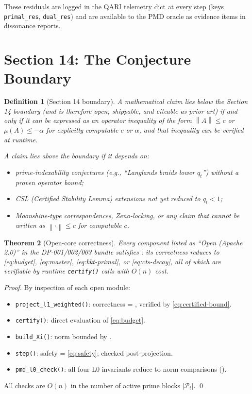 \documentclass[12pt,letterpaper]{article}
\newtheorem{theorem}{Theorem}[section]
\newtheorem{definition}[theorem]{Definition}
\newcommand{\Hnorm}[1]{\left\|#1\right\|}
\newcommand{\qt}{q_t}
\newcommand{\Pt}{\mathcal{P}_t}
\begin{document}
These residuals are logged in the QARI telemetry dict at every step
(keys \texttt{primal\_res}, \texttt{dual\_res}) and are available to
the PMD oracle as evidence items in dissonance reports.

\section{Section 14: The Conjecture Boundary}
\label{sec:s14}

\begin{definition}[Section 14 boundary]
\label{def:s14}
A mathematical claim lies \emph{below the Section 14 boundary} (and is
therefore open, shippable, and citeable as prior art) if and only if
it can be expressed as an operator inequality of the form
$\Hnorm{A} \leq c$ or $\mu(A) \leq -\alpha$ for explicitly computable
$c$ or $\alpha$, and that inequality can be verified at runtime.

A claim lies \emph{above the boundary} if it depends on:
\begin{itemize}
  \item prime-indexability conjectures (e.g., ``Langlands braids
        lower $\qt$'') without a proven operator bound;
  \item CSL (Certified Stability Lemma) extensions not yet reduced
        to $\qt < 1$;
  \item Moonshine-type correspondences, Zeno-locking, or any claim
        that cannot be written as $\Hnorm{\cdot} \leq c$ for
        computable $c$.
\end{itemize}
\end{definition}

\begin{theorem}[Open-core correctness]
\label{thm:opencore}
Every component listed as ``Open (Apache 2.0)'' in the DP-001/002/003
bundle satisfies : its correctness reduces to
\eqref{eq:budget}, \eqref{eq:master}, \eqref{eq:kkt-primal}, or
\eqref{eq:cts-decay}, all of which are verifiable by runtime
\texttt{certify()} calls with $O(n)$ cost.
\end{theorem}

\begin{proof}
By inspection of each open module:
\begin{itemize}
  \item \texttt{project\_l1\_weighted()}: correctness = ,
        verified by \eqref{eq:certified-bound}.
  \item \texttt{certify()}: direct evaluation of \eqref{eq:budget}.
  \item \texttt{build\_Xi()}: norm bounded by .
  \item \texttt{step()}: safety = \eqref{eq:safety}; checked
        post-projection.
  \item \texttt{pmd\_l0\_check()}: all four L0 invariants reduce to
        norm comparisons ().
\end{itemize}
All checks are $O(n)$ in the number of active prime blocks $|\Pt|$.
\qed
\end{proof}
\end{document}
